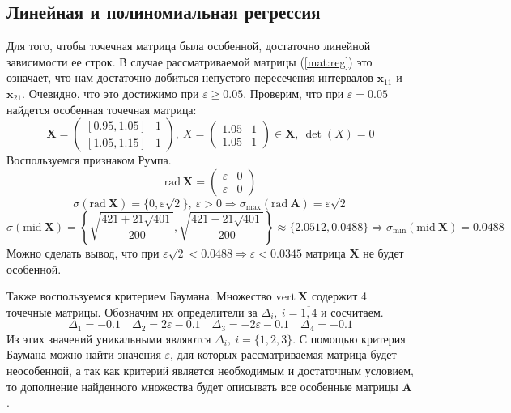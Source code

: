 \documentclass[a4paper]{article}
\begin{document}
\subsection{Линейная и полиномиальная регрессия}
Для того, чтобы точечная матрица была особенной, достаточно линейной зависимости ее строк. В случае рассматриваемой матрицы (\ref{mat:reg}) это означает, что нам достаточно добиться непустого пересечения интервалов $\mathbf{x}_{1 1}$ и $\mathbf{x}_{2 1}$. Очевидно, что это достижимо при $\varepsilon\geq0.05$. Проверим, что при $\varepsilon=0.05$ найдется особенная точечная матрица:
\begin{equation*}
    \mathbf{X}=\begin{pmatrix}
  [0.95,1.05]& 1\\
  [1.05,1.15]& 1
\end{pmatrix},\: X=\begin{pmatrix}
  1.05& 1\\
  1.05& 1
\end{pmatrix}\in\mathbf{X},\:\det(X)=0
\end{equation*}
Воспользуемся признаком Румпа.
\begin{equation*}
    \mathrm{rad}\:\mathbf{X}=\begin{pmatrix}
    \varepsilon&0\\
    \varepsilon&0
    \end{pmatrix}
\end{equation*}
\begin{equation*}
    \sigma(\mathrm{rad}\:\mathbf{X})=\{0,\varepsilon\sqrt{2}\},\:\varepsilon>0\Rightarrow\sigma_{\mathrm{max}}(\mathrm{rad}\:\mathbf{A})=\varepsilon\sqrt{2}
\end{equation*}
\begin{equation*}
    \sigma(\mathrm{mid}\:\mathbf{X})=\left\{\sqrt{\frac{421+21\sqrt{401}}{200}},\sqrt{\frac{421-21\sqrt{401}}{200}}\right\}\approx\{2.0512, 0.0488\}\Rightarrow\sigma_{\mathrm{min}}(\mathrm{mid}\:\mathbf{X})=0.0488
\end{equation*}
Можно сделать вывод, что при $\varepsilon\sqrt{2}<0.0488\Rightarrow\varepsilon<0.0345$ матрица $\mathbf{X}$ не будет особенной.

Также воспользуемся критерием Баумана. Множество $\mathrm{vert}\:\mathbf{X}$ содержит 4 точечные матрицы. Обозначим их определители за $\Delta_i,\:i=\overline{1,4}$ и сосчитаем.
\begin{equation*}
    \Delta_1=-0.1\quad\Delta_2=2\varepsilon-0.1\quad\Delta_3=-2\varepsilon-0.1\quad\Delta_4=-0.1
\end{equation*}
Из этих значений уникальными являются $\Delta_i,\:i=\{1,2,3\}$. С помощью критерия Баумана можно найти значения $\varepsilon$, для которых рассматриваемая матрица будет неособенной, а так как критерий является необходимым и достаточным условием, то дополнение найденного множества будет описывать все особенные матрицы $\mathbf{A}$.
\end{document}
